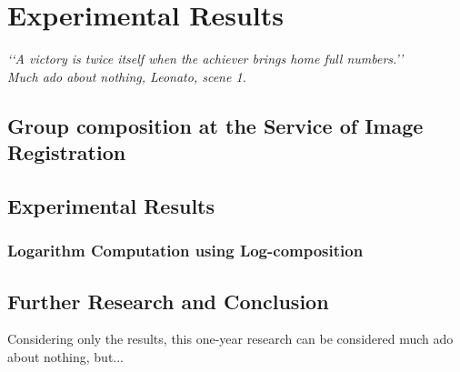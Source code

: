 \chapter{Experimental Results}\label{ch:results}

\begin{flushright}
	\emph{\lq\lq A victory is twice itself when the achiever brings home full numbers.\rq\rq \\
		       \emph{Much ado about nothing}, Leonato, scene 1.}
\end{flushright}


\section{Group composition at the Service of Image Registration}




\section{Experimental Results}



\subsection{Logarithm Computation using Log-composition}





\section{Further Research and Conclusion}\label{ch:conclusions}


Considering only the results, this one-year research can be considered much ado about nothing, but...
